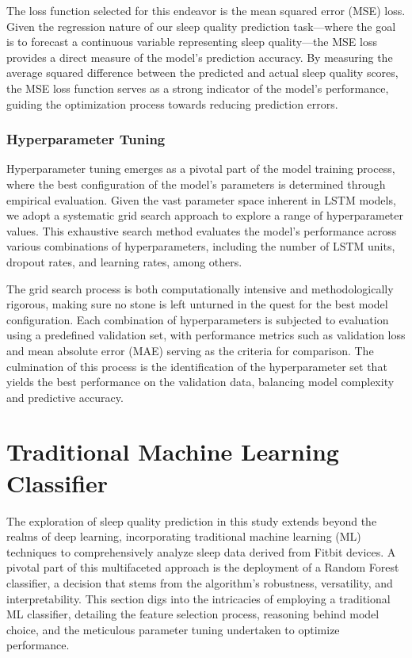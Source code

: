 \documentclass[10pt]{extarticle}
\begin{document}
The loss function selected for this endeavor is the mean squared error (MSE) loss. Given the regression nature of our sleep quality prediction task—where the goal is to forecast a continuous variable representing sleep quality---the MSE loss provides a direct measure of the model's prediction accuracy. By measuring the average squared difference between the predicted and actual sleep quality scores, the MSE loss function serves as a strong indicator of the model's performance, guiding the optimization process towards reducing prediction errors.

\subsubsection{Hyperparameter Tuning}

Hyperparameter tuning emerges as a pivotal part of the model training process, where the best configuration of the model's parameters is determined through empirical evaluation. Given the vast parameter space inherent in LSTM models, we adopt a systematic grid search approach to explore a range of hyperparameter values. This exhaustive search method evaluates the model's performance across various combinations of hyperparameters, including the number of LSTM units, dropout rates, and learning rates, among others.

The grid search process is both computationally intensive and methodologically rigorous, making sure no stone is left unturned in the quest for the best model configuration. Each combination of hyperparameters is subjected to evaluation using a predefined validation set, with performance metrics such as validation loss and mean absolute error (MAE) serving as the criteria for comparison. The culmination of this process is the identification of the hyperparameter set that yields the best performance on the validation data, balancing model complexity and predictive accuracy.

\section{Traditional Machine Learning Classifier}

The exploration of sleep quality prediction in this study extends beyond the realms of deep learning, incorporating traditional machine learning (ML) techniques to comprehensively analyze sleep data derived from Fitbit devices. A pivotal part of this multifaceted approach is the deployment of a Random Forest classifier, a decision that stems from the algorithm's robustness, versatility, and interpretability. This section digs into the intricacies of employing a traditional ML classifier, detailing the feature selection process, reasoning behind model choice, and the meticulous parameter tuning undertaken to optimize performance.
\end{document}
